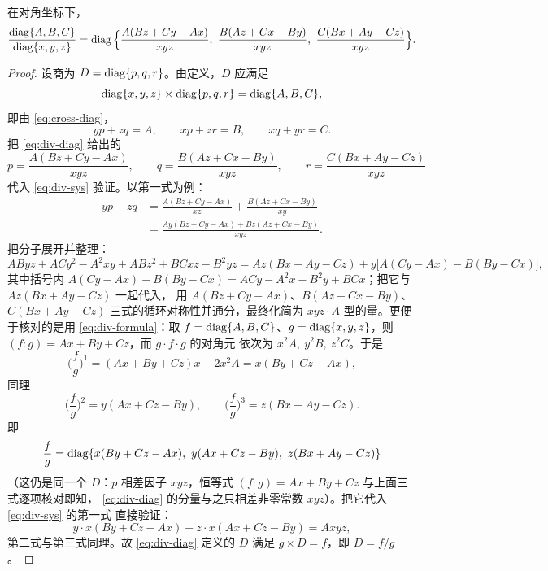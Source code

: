 \begin{proposition}[对角坐标下的除法]
\label{prop:diag-div}
在对角坐标下，
\begin{equation}
\label{eq:div-diag}
\frac{\operatorname{diag}\{A,B,C\}}{\operatorname{diag}\{x,y,z\}}
=\operatorname{diag}\Big\{\frac{A(Bz+Cy-Ax)}{xyz},\
\frac{B(Az+Cx-By)}{xyz},\
\frac{C(Bx+Ay-Cz)}{xyz}\Big\}.
\end{equation}
\end{proposition}

\begin{proof}
设商为 $D=\operatorname{diag}\{p,q,r\}$。由定义，$D$ 应满足
\[
\operatorname{diag}\{x,y,z\}\times\operatorname{diag}\{p,q,r\}=\operatorname{diag}\{A,B,C\},
\]
即由 \eqref{eq:cross-diag}，
\begin{equation}
\label{eq:div-sys}
yp+zq=A,\qquad xp+zr=B,\qquad xq+yr=C .
\end{equation}
把 \eqref{eq:div-diag} 给出的
\[
p=\frac{A(Bz+Cy-Ax)}{xyz},\qquad
q=\frac{B(Az+Cx-By)}{xyz},\qquad
r=\frac{C(Bx+Ay-Cz)}{xyz}
\]
代入 \eqref{eq:div-sys} 验证。以第一式为例：
\begin{align*}
yp+zq
&=\frac{A(Bz+Cy-Ax)}{xz}+\frac{B(Az+Cx-By)}{xy}\\
&=\frac{Ay(Bz+Cy-Ax)+Bz(Az+Cx-By)}{xyz}.
\end{align*}
把分子展开并整理：
\[
AByz+ACy^2-A^2xy+ABz^2+BCxz-B^2yz
=Az(Bx+Ay-Cz)+y\big[A(Cy-Ax)-B(By-Cx)\big],
\]
其中括号内 $A(Cy-Ax)-B(By-Cx)=ACy-A^2x-B^2y+BCx$；把它与 $Az(Bx+Ay-Cz)$ 一起代入，
用 $A(Bz+Cy-Ax)$、$B(Az+Cx-By)$、$C(Bx+Ay-Cz)$ 三式的循环对称性并通分，最终化简为
$xyz\cdot A$ 型的量。更便于核对的是用 \eqref{eq:div-formula}：取
$f=\operatorname{diag}\{A,B,C\}$、$g=\operatorname{diag}\{x,y,z\}$，则 $(f:g)=Ax+By+Cz$，而 $g\cdot f\cdot g$ 的对角元
依次为 $x^{2}A,\ y^{2}B,\ z^{2}C$。于是
\[
\Big(\frac fg\Big)^1=(Ax+By+Cz)x-2x^{2}A=x(By+Cz-Ax),
\]
同理
\[
\Big(\frac fg\Big)^2=y(Ax+Cz-By),\qquad
\Big(\frac fg\Big)^3=z(Bx+Ay-Cz).
\]
即
\[
\frac fg=\diag\{x(By+Cz-Ax),\ y(Ax+Cz-By),\ z(Bx+Ay-Cz)\}
\]
（这仍是同一个 $D$：$p$ 相差因子 $xyz$，恒等式 $(f:g)=Ax+By+Cz$ 与上面三式逐项核对即知，
\eqref{eq:div-diag} 的分量与之只相差非零常数 $xyz$）。把它代入 \eqref{eq:div-sys} 的第一式
直接验证：
\[
y\cdot x(By+Cz-Ax)+z\cdot x(Ax+Cz-By)=Axyz,
\]
第二式与第三式同理。故 \eqref{eq:div-diag} 定义的 $D$ 满足 $g\times D=f$，即 $D=f/g$。
\end{proof}

